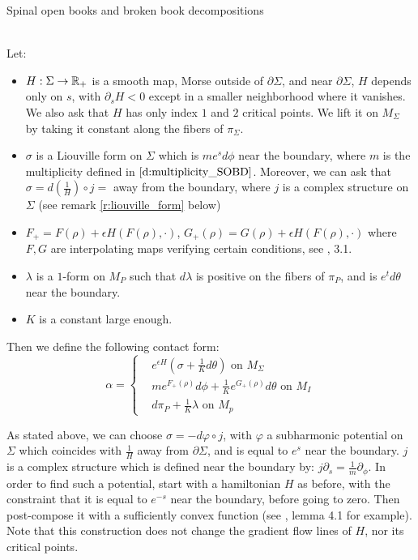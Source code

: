 \documentclass[../main.tex]{subfiles}
\begin{document}
\begin{section}{Spinal open books and broken book decompositions}
\begin{definition}\label{d:contact_form_SOBD}
\text{}\\
Let:
\begin{itemize}
    \item $H:\Sigma\rightarrow \mathbb{R}_+$ is a smooth map, Morse outside of $\partial\Sigma$, and near $\partial\Sigma$, $H$ depends only on $s$, with $\partial_s H <0 $ except in a smaller neighborhood where it vanishes. We also ask that $H$ has only index $1$ and $2$ critical points. We lift it on $M_\Sigma$ by taking it constant along the fibers of $\pi_\Sigma$.
    \item $\sigma$ is a Liouville form on $\Sigma$ which is $me^sd\phi$ near the boundary, where $m$ is the multiplicity defined in $\ref{d:multiplicity_SOBD}$. Moreover, we can ask that $\sigma = d(\frac{1}{H})\circ j = $ away from the boundary, where $j$ is a complex structure on $\Sigma$ (see remark \ref{r:liouville_form} below)
    \item $F_+ = F(\rho) +\epsilon H(F(\rho),\cdot)$, $G_+(\rho) = G(\rho) + \epsilon H(F(\rho),\cdot)$ where $F,G$ are interpolating maps verifying certain conditions, see \cite{SOBD2}, 3.1.
    \item $\lambda$ is a $1$-form on $M_P$ such that $d\lambda$ is positive on the fibers of $\pi_P$, and is $e^td\theta$ near the boundary.
    \item $K$ is a constant large enough.
\end{itemize}
Then we define the following contact form: 
\begin{equation*}\label{eq:contact_SOBD}
\alpha = \left\{\begin{array}{lll}
     &e^{\epsilon H}(\sigma+\frac{1}{K}d\theta)  \mbox{ on } M_\Sigma \\
     &me^{F_+(\rho)}d\phi + \frac{1}{K}e^{G_+(\rho)}d\theta \mbox{ on } M_I  \\
     &d\pi_P + \frac{1}{K}\lambda \mbox{ on } M_p  
\end{array}\right.
\end{equation*}
\end{definition}

\begin{remark}\label{r:liouville_form}
As stated above, we can choose $\sigma = -d\varphi \circ j$, with $\varphi$ a subharmonic potential on $\Sigma$ which coincides with $\frac{1}{H}$ away from $\partial\Sigma$, and is equal to $e^s$ near the boundary. $j$ is a complex structure which is defined near the boundary by: $j\partial_s = \frac{1}{m}\partial_\phi$. In order to find such a potential, start with a hamiltonian $H$ as before, with the constraint that it is equal to $e^{-s}$ near the boundary, before going to zero. Then post-compose it with a sufficiently convex function (see \cite{Latschev_2011}, lemma 4.1 for example). Note that this construction does not change the gradient flow lines of $H$, nor its critical points. 
\end{remark}


\end{section}
\end{document}
